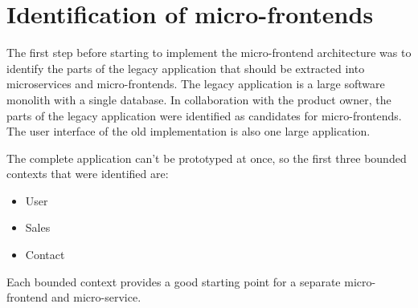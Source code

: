 \section{Identification of micro-frontends}\label{section:applied-methods:identification-micro-frontends}

The first step before starting to implement the micro-frontend architecture was to identify the parts of the legacy application that should be extracted into microservices and micro-frontends. The legacy application is a large software monolith with a single database. In collaboration with the product owner, the parts of the legacy application were identified as candidates for micro-frontends. The user interface of the old implementation is also one large application.

The complete application can't be prototyped at once, so the first three bounded contexts that were identified are:

\begin{itemize}
  \item User
  \item Sales
  \item Contact
\end{itemize}

Each bounded context provides a good starting point for a separate micro-frontend and micro-service. 
